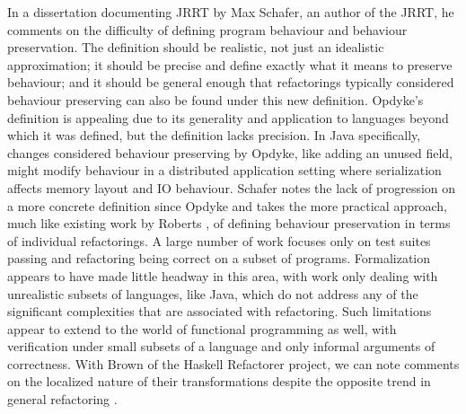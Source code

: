 In a dissertation documenting JRRT by Max Schafer, an author of the JRRT, he comments on the difficulty of defining program behaviour and behaviour preservation. The definition should be realistic, not just an idealistic approximation; it should be precise and define exactly what it means to preserve behaviour; and it should be general enough that refactorings typically considered behaviour preserving can also be found under this new definition. Opdyke's definition is appealing due to its generality and application to languages beyond which it was defined, but the definition lacks precision. In Java specifically, changes considered behaviour preserving by Opdyke, like adding an unused field, might modify behaviour in a distributed application setting where serialization affects memory layout and IO behaviour. Schafer notes the lack of progression on a more concrete definition since Opdyke and takes the more practical approach, much like existing work by Roberts \cite[p. 111]{schafer2010specification}, of defining behaviour preservation in terms of individual refactorings. A large number of work focuses only on test suites passing and refactoring being correct on a subset of programs. Formalization appears to have made little headway in this area, with work only dealing with unrealistic subsets of languages, like Java, which do not address any of the significant complexities that are associated with refactoring. Such limitations appear to extend to the world of functional programming as well, with verification under small subsets of a language and only informal arguments of correctness. With Brown of the Haskell Refactorer project, we can note comments on the localized nature of their transformations despite the opposite trend in general refactoring \cite{brown2008tool}.

